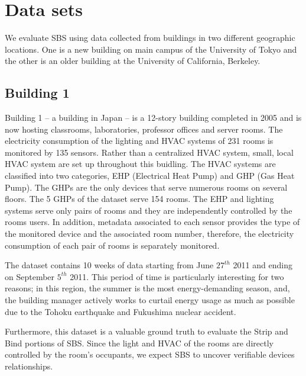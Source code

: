 \section{Data sets}
We evaluate SBS using data collected from buildings in two different geographic locations.  
One is a new building on main campus of the University of Tokyo and the other is an older building at 
the University of California, Berkeley.

\subsection{Building 1} \label{data:engbldg2}
Building 1 -- a building in Japan -- is a 12-story building completed in 2005 and is now hosting classrooms, laboratories, professor offices 
and server rooms.  
The electricity consumption of the lighting and HVAC systems of 231 rooms is monitored by 135 sensors.
Rather than a centralized HVAC system, small, local HVAC system are set up throughout this buidling.  
The HVAC systems are classified into two categories, EHP (Electrical Heat Pump) and GHP (Gas Heat Pump).
The GHPs are the only devices that serve numerous rooms on several floors.  The 5 GHPs of the dataset serve 154 rooms.
The EHP and lighting systems serve only pairs of rooms and they are independently controlled by the rooms users.
In addition, metadata associated to each sensor provides the type of the monitored device and the associated room number, 
therefore, the electricity consumption of each pair of rooms is separately monitored.

The dataset contains 10 weeks of data starting from June $27^{th}$ 2011 and ending on September $5^{th}$ 2011.
This period of time is particularly interesting for two reasons; in this region, the summer is the most energy-demanding 
season, and, the building manager actively works to curtail energy usage as much as possible due to the Tohoku earthquake and Fukushima nuclear accident.

Furthermore, this dataset is a valuable ground truth to evaluate the Strip and Bind portions of SBS.
Since the light and HVAC of the rooms are directly controlled by the room's occupants, we expect SBS to uncover verifiable devices 
relationships.  


